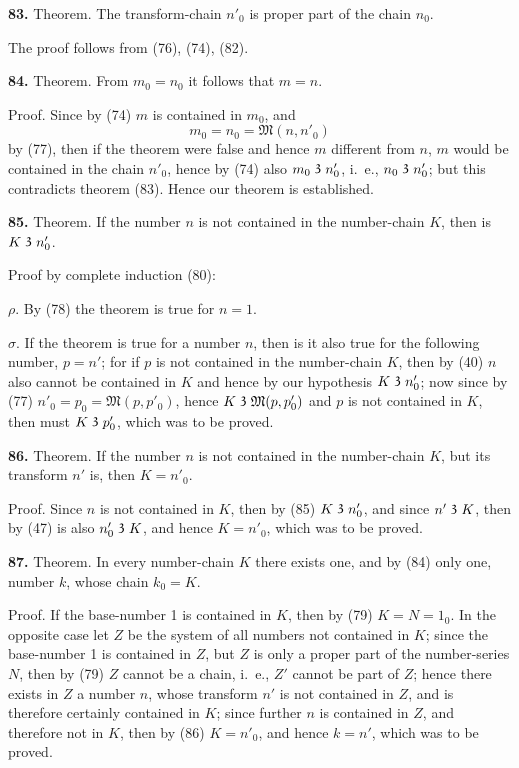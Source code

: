 \documentclass[oneside]{book}
\newcommand\partof{\mathrel{\raisebox{0.45ex}{$\mathfrak{3}$}}}   %
\newcommand\mypara{\medskip\textbf}
\begin{document}
\mypara{83.} Theorem. The transform-chain $n'_0$ is proper
part of the chain $n_0$.

The proof follows from (76), (74), (82).

\mypara{84.} Theorem. From $m_0= n_0$ it follows that $m=n$.

Proof.  Since by (74) $m$ is contained in $m_0$, and
\[
m_0= n_0 = \mathfrak{M}(n, n'_0)
\]
by (77), then if the theorem were false and hence $m$
different from $n$, $m$ would be contained in the chain
$n'_0$, hence by (74) also $m_0 \partof n'_0$, i.~e., $n_0 \partof n'_0$; but this
contradicts theorem (83). Hence our theorem is established.

\mypara{85.} Theorem. If the number $n$ is not contained
in the number-chain $K$, then is $K \partof n'_0$.

Proof by complete induction (80):

$\rho$. By (78) the theorem is true for $n=1$.

$\sigma$. If the theorem is true for a number $n$, then is
it also true for the following number, $p= n'$; for if $p$
is not contained in the number-chain $K$, then by (40)
$n$ also cannot be contained in $K$ and hence by our
hypothesis $K \partof n'_0$; now since by (77) $n'_0 = p_0 =
\mathfrak{M}(p,p'_0)$, hence $K \partof \mathfrak{M}(p,p'_0)$ and $p$ is not contained
in $K$, then must $K \partof p'_0$, which was to be proved.

\mypara{86.} Theorem. If the number $n$ is not contained
in the number-chain $K$, but its transform $n'$ is, then
$K=n'_0$.

Proof. Since $n$ is not contained in $K$, then by
(85) $K \partof n'_0$, and since $n' \partof K$, then by (47) is also
$n'_0 \partof K$, and hence $K=n'_0$, which was to be proved.

\mypara{87.} Theorem. In every number-chain $K$ there exists
one, and by (84) only one, number $k$, whose chain
$k_0 = K$.

Proof. If the base-number 1 is contained in $K$,
then by (79) $K=N=1_0$. In the opposite case let $Z$
be the system of all numbers not contained in $K$;
since the base-number 1 is contained in $Z$, but $Z$ is
only a proper part of the number-series $N$, then by
(79) $Z$ cannot be a chain, i.~e., $Z'$ cannot be part of
$Z$; hence there exists in $Z$ a number $n$, whose transform
$n'$ is not contained in $Z$, and is therefore certainly
contained in $K$; since further $n$ is contained in $Z$, and
therefore not in $K$, then by (86) $K=n'_0$, and hence
$k = n'$, which was to be proved.
\end{document}
